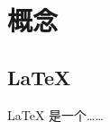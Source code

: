 \documentclass{ctexart}
\begin{document}
  \section{概念}
  \subsection{\LaTeX{}}
  \LaTeX{} 是一个……
\end{document}
